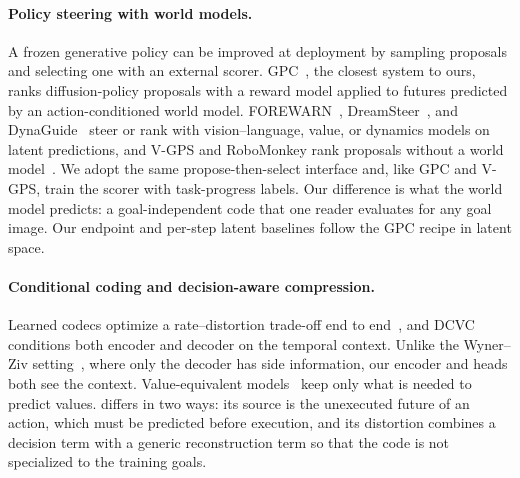 \paragraph{Policy steering with world models.}
A frozen generative policy can be improved at deployment by sampling proposals and selecting one with an external scorer.
GPC~\cite{qi2025gpc}, the closest system to ours, ranks diffusion-policy proposals with a reward model applied to futures predicted by an action-conditioned world model.
FOREWARN~\cite{wu2025forewarn}, DreamSteer~\cite{cui2026dreamsteer}, and DynaGuide~\cite{du2025dynaguide} steer or rank with vision--language, value, or dynamics models on latent predictions, and V-GPS and RoboMonkey rank proposals without a world model~\cite{nakamoto2024vgps,kwok2025robomonkey}.
We adopt the same propose-then-select interface and, like GPC and V-GPS, train the scorer with task-progress labels.
Our difference is what the world model predicts: a goal-independent code that one reader evaluates for any goal image.
Our endpoint and per-step latent baselines follow the GPC recipe in latent space.

\paragraph{Conditional coding and decision-aware compression.}
Learned codecs optimize a rate--distortion trade-off end to end~\cite{balle2017end}, and DCVC~\cite{li2021dcvc} conditions both encoder and decoder on the temporal context.
Unlike the Wyner--Ziv setting~\cite{wyner1976ratedistortion}, where only the decoder has side information, our encoder and heads both see the context.
Value-equivalent models~\cite{grimm2020value,schrittwieser2020muzero,arumugam2022deciding} keep only what is needed to predict values.
\method differs in two ways: its source is the unexecuted future of an action, which must be predicted before execution, and its distortion combines a decision term with a generic reconstruction term so that the code is not specialized to the training goals.
